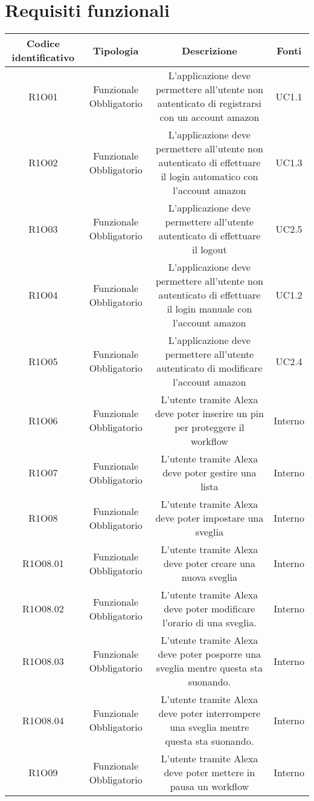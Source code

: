 \section{Requisiti funzionali}
\begin{tabularx}{\textwidth}{|C|C|C|C|}
	\hline
     \textbf{Codice identificativo} & \textbf{Tipologia} & \textbf{Descrizione} & \textbf{Fonti} \\
    \hline
	\endhead
	R1O01& Funzionale Obbligatorio &L'applicazione deve permettere all'utente non autenticato di registrarsi con un account amazon& UC1.1	\\
	\hline
	R1O02& Funzionale Obbligatorio &L'applicazione deve permettere all'utente non autenticato di effettuare il login automatico con l'account amazon & UC1.3\\
	\hline
	R1O03& Funzionale Obbligatorio &L'applicazione deve permettere all'utente autenticato di  effettuare il logout & UC2.5\\
	\hline
	R1O04& Funzionale Obbligatorio &L'applicazione deve permettere all'utente non autenticato di effettuare il login manuale con l'account amazon& UC1.2\\
	\hline
	R1O05& Funzionale Obbligatorio&L'applicazione deve permettere all'utente autenticato di modificare l'account amazon& UC2.4\\
	\hline
	R1O06& Funzionale Obbligatorio&L'utente tramite Alexa deve poter inserire un pin per proteggere il workflow & Interno \\
	\hline
	R1O07&Funzionale Obbligatorio & L'utente tramite Alexa deve poter gestire una lista& Interno\\
	\hline
	R1O08&Funzionale Obbligatorio &L'utente tramite Alexa deve poter impostare una sveglia &Interno\\
	\hline
	R1O08.01 & Funzionale Obbligatorio & L'utente tramite Alexa deve poter creare una nuova sveglia &Interno\\
	\hline
	R1O08.02 & Funzionale Obbligatorio & L'utente tramite Alexa deve poter modificare l'orario di una sveglia. &Interno\\
	\hline
	R1O08.03 & Funzionale Obbligatorio & L'utente tramite Alexa deve poter posporre una sveglia mentre questa sta suonando. &Interno\\
	\hline	
	R1O08.04 & Funzionale Obbligatorio & L'utente tramite Alexa deve poter interrompere una sveglia mentre questa sta suonando. &Interno\\
	\hline
	R1O09&Funzionale Obbligatorio  &L'utente tramite Alexa deve poter mettere in pausa un workflow &Interno \\

\end{tabularx}
